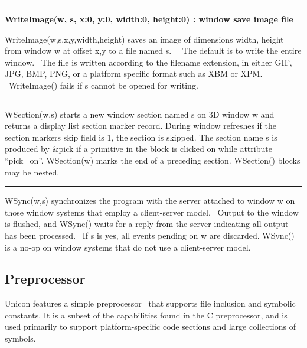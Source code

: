 \bigskip\hrule\vspace{0.1cm}
\noindent
{\bf WriteImage(w, s, x:0, y:0, width:0, height:0) : window
\hfill save image file}

\noindent
\textsf{WriteImage(w,s,x,y,width,height)} saves an image of dimensions
width, height from window w at offset \textsf{x,y} to a file named
\textsf{s}. \ \ The default is to write the entire window. \ The file
is written according to the filename extension, in either GIF, JPG,
BMP, PNG, or a platform specific format such as XBM or XPM.
\ \textsf{WriteImage()} fails if \textsf{s} cannot be opened for
writing.

\bigskip\hrule\vspace{0.1cm}

\noindent
\textsf{WSection(w,s)} starts a new window section named \textsf{s} on
3D window \textsf{w} and returns a display list section marker record.
During window refreshes if the section marker{\textquotesingle}s
\textsf{skip} field is 1, the section is skipped. The section name
\textsf{s} is produced by \textsf{\&pick} if a primitive in the block
is clicked on while attribute
\textsf{{\textquotedblleft}pick=on{\textquotedblright}}.
\textsf{WSection(w)} marks the end of a preceding section.
\textsf{WSection()} blocks may be nested.

\bigskip\hrule\vspace{0.1cm}

\noindent
\textsf{WSync(w,s)} synchronizes the program with the server attached to
window \textsf{w} on those window systems that employ a client-server
model. \ Output to the window is flushed, and \textsf{WSync()} waits
for a reply from the server indicating all output has been processed.
\ If \textsf{s} is \textsf{{\textquotedbl}yes{\textquotedbl}}, all
events pending on \textsf{w} are discarded. \textsf{WSync()} is a no-op
on window systems that do not use a client-server model.

\subsection{Preprocessor}

Unicon features a simple preprocessor \ that
supports file inclusion and symbolic constants. It is a subset of the
capabilities found in the C preprocessor, and is used primarily to
support platform-specific code sections and large collections of
symbols.


